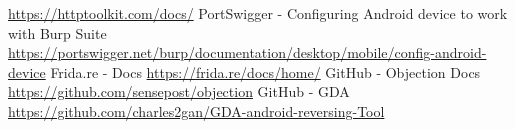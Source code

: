 \documentclass[a4paper, binding=0.6cm, noexaminfo, english]{sapthesis}
\begin{document}
\begin{thebibliography}{99}
			\url{https://httptoolkit.com/docs/}
			 PortSwigger - Configuring Android device to work with Burp Suite\newline
			\url{https://portswigger.net/burp/documentation/desktop/mobile/config-android-device}
			 Frida.re - Docs\newline
			\url{https://frida.re/docs/home/}
			 GitHub - Objection Docs\newline
			\url{https://github.com/sensepost/objection}
			 GitHub - GDA\newline
			\url{https://github.com/charles2gan/GDA-android-reversing-Tool}

		\end{thebibliography}
\end{document}
